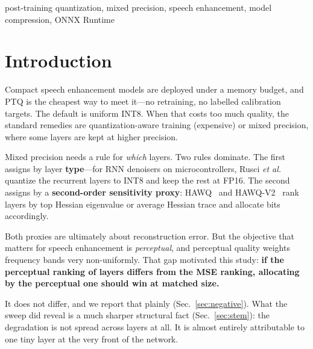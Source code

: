 \documentclass[conference]{IEEEtran}
\begin{document}
\begin{IEEEkeywords}
post-training quantization, mixed precision, speech enhancement, model compression, ONNX Runtime
\end{IEEEkeywords}

\section{Introduction}

Compact speech enhancement models are deployed under a memory budget, and PTQ is the cheapest way
to meet it---no retraining, no labelled calibration targets. The default is uniform INT8. When that
costs too much quality, the standard remedies are quantization-aware training (expensive) or mixed
precision, where some layers are kept at higher precision.

Mixed precision needs a rule for \emph{which} layers. Two rules dominate. The first assigns by
layer \textbf{type}---for RNN denoisers on microcontrollers, Rusci \emph{et al.}~\cite{rusci2022}
quantize the recurrent layers to INT8 and keep the rest at FP16. The second assigns by a
\textbf{second-order sensitivity proxy}: HAWQ~\cite{dong2019} and HAWQ-V2~\cite{dong2020} rank
layers by top Hessian eigenvalue or average Hessian trace and allocate bits accordingly.

Both proxies are ultimately about reconstruction error. But the objective that matters for speech
enhancement is \emph{perceptual}, and perceptual quality weights frequency bands very
non-uniformly. That gap motivated this study: \textbf{if the perceptual ranking of layers differs
from the MSE ranking, allocating by the perceptual one should win at matched size.}

It does not differ, and we report that plainly (Sec.~\ref{sec:negative}). What the sweep did reveal
is a much sharper structural fact (Sec.~\ref{sec:stem}): the degradation is not spread across
layers at all. It is almost entirely attributable to one tiny layer at the very front of the
network.
\end{document}
